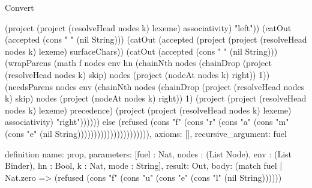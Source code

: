 \begin{lexlean}{Convert}
\begin{semanticmodule}
{(project (project (resolveHead nodes k) lexeme) associativity) "left")) (catOut (accepted (cons " " (nil String))) (catOut (accepted (project (project (resolveHead nodes k) lexeme) surfaceChars)) (catOut (accepted (cons " " (nil String))) (wrapParens (math f nodes env hn (chainNth nodes (chainDrop (project (resolveHead nodes k) skip) nodes (project (nodeAt nodes k) right)) 1)) (needsParens nodes env (chainNth nodes (chainDrop (project (resolveHead nodes k) skip) nodes (project (nodeAt nodes k) right)) 1) (project (project (resolveHead nodes k) lexeme) precedence) (project (project (resolveHead nodes k) lexeme) associativity) "right")))))) else (refused (cons "f" (cons "r" (cons "a" (cons "m" (cons "e" (nil String)))))))))))))))))))))),
  axioms: [],
  recursive_argument: fuel
}

definition{
  name: prop,
  parameters: [fuel : Nat, nodes : (List Node), env : (List Binder), hn : Bool, k : Nat, mode : String],
  result: Out,
  body: (match fuel
    | Nat.zero => (refused (cons "f" (cons "u" (cons "e" (cons "l" (nil String))))))
}
\end{semanticmodule}
\end{lexlean}

